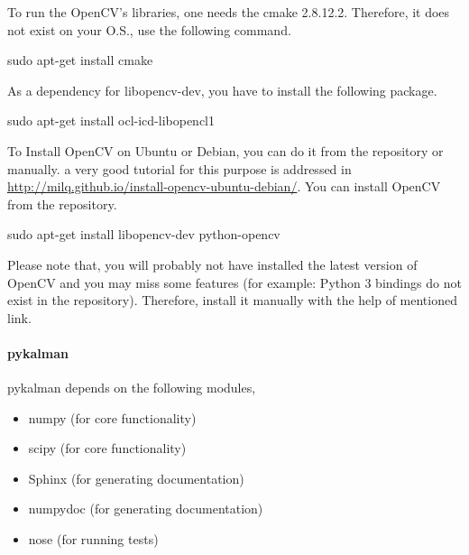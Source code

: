 \documentclass[[12pt,DIV14,BCOR12mm,a4paper,footexclude,headinclude,halfparskip-,twoside,openright,cleardoubleempty,idxtotoc,bibtotoc]{article}
\begin{document}
To run the OpenCV's libraries, one needs the cmake 2.8.12.2. Therefore, it does not exist on your O.S., use the following command.

 \begin{framed}

sudo apt-get install cmake

\end{framed} 


As a dependency for libopencv-dev, you have to install the following package.

 \begin{framed}

sudo apt-get install ocl-icd-libopencl1

\end{framed} 


To Install OpenCV on Ubuntu or Debian, you can do it from the repository or manually. a very good tutorial for this purpose is addressed in \url{http://milq.github.io/install-opencv-ubuntu-debian/}. You can install OpenCV from the repository.

 \begin{framed}

sudo apt-get install libopencv-dev python-opencv

\end{framed} 

Please note that, you will probably not have installed the latest version of OpenCV and you may miss some features (for example: Python 3 bindings do not exist in the repository). Therefore, install it manually with the help of mentioned link.

\paragraph{pykalman}

pykalman depends on the following modules,


\begin{itemize}

\item numpy (for core functionality)
\item scipy (for core functionality)
\item Sphinx (for generating documentation)
\item numpydoc (for generating documentation)
\item nose (for running tests)

\end{itemize}
\end{document}
